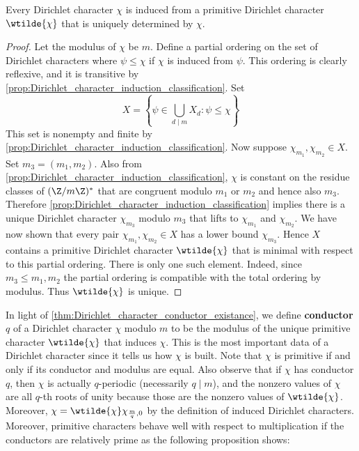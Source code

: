       \begin{theorem}\label{thm:Dirichlet_character_conductor_existance}
        Every Dirichlet character $\chi$ is induced from a primitive Dirichlet character $\wtilde{\chi}$ that is uniquely determined by $\chi$.
      \end{theorem}
      \begin{proof}
        Let the modulus of $\chi$ be $m$. Define a partial ordering on the set of Dirichlet characters where $\psi \le \chi$ if $\chi$ is induced from $\psi$. This ordering is clearly reflexive, and it is transitive by \cref{prop:Dirichlet_character_induction_classification}. Set
        \[
          X = \left\{\psi \in \bigcup_{d \mid m}X_{d}:\psi \le \chi\right\}
        \]
        This set is nonempty and finite by \cref{prop:Dirichlet_character_induction_classification}. Now suppose $\chi_{m_{1}},\chi_{m_{2}} \in X$. Set $m_{3} = (m_{1},m_{2})$. Also from \cref{prop:Dirichlet_character_induction_classification}, $\chi$ is constant on the residue classes of $(\Z/m\Z)^{\ast}$ that are congruent modulo $m_{1}$ or $m_{2}$ and hence also $m_{3}$. Therefore \cref{prop:Dirichlet_character_induction_classification} implies there is a unique Dirichlet character $\chi_{m_{3}}$ modulo $m_{3}$ that lifts to $\chi_{m_{1}}$ and $\chi_{m_{2}}$. We have now shown that every pair $\chi_{m_{1}},\chi_{m_{2}} \in X$ has a lower bound $\chi_{m_{3}}$. Hence $X$ contains a primitive Dirichlet character $\wtilde{\chi}$ that is minimal with respect to this partial ordering. There is only one such element. Indeed, since $m_{3} \le m_{1},m_{2}$ the partial ordering is compatible with the total ordering by modulus. Thus $\wtilde{\chi}$ is unique.
      \end{proof}

      In light of \cref{thm:Dirichlet_character_conductor_existance}, we define \textbf{conductor} $q$ of a Dirichlet character $\chi$ modulo $m$ to be the modulus of the unique primitive character $\wtilde{\chi}$ that induces $\chi$. This is the most important data of a Dirichlet character since it tells us how $\chi$ is built. Note that $\chi$ is primitive if and only if its conductor and modulus are equal. Also observe that if $\chi$ has conductor $q$, then $\chi$ is actually $q$-periodic (necessarily $q \mid m$), and the nonzero values of $\chi$ are all $q$-th roots of unity because those are the nonzero values of $\wtilde{\chi}$. Moreover, $\chi = \wtilde{\chi}\chi_{\frac{m}{q},0}$ by the definition of induced Dirichlet characters. Moreover, primitive characters behave well with respect to multiplication if the conductors are relatively prime as the following proposition shows:

